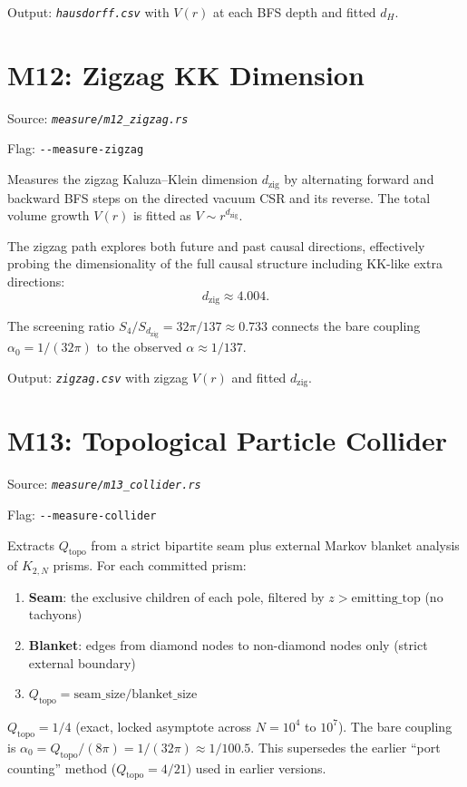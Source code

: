 \documentclass[11pt, a4paper, openany]{book}
\newcommand{\flag}[1]{\texttt{-{}-#1}}
\newcommand{\file}[1]{\texttt{\itshape #1}}
\begin{document}
Output: \file{hausdorff.csv} with $V(r)$ at each BFS depth and fitted $d_H$.

\section{M12: Zigzag KK Dimension}

Source: \file{measure/m12\_zigzag.rs}

Flag: \flag{measure-zigzag}

Measures the zigzag Kaluza--Klein dimension $d_{\text{zig}}$ by alternating
forward and backward BFS steps on the directed vacuum CSR and its reverse.
The total volume growth $V(r)$ is fitted as $V \sim r^{d_{\text{zig}}}$.

The zigzag path explores both future and past causal directions, effectively
probing the dimensionality of the full causal structure including KK-like
extra directions:
\[
  d_{\text{zig}} \approx 4.004.
\]

The screening ratio $S_4 / S_{d_{\text{zig}}} = 32\pi / 137 \approx 0.733$
connects the bare coupling $\alpha_0 = 1/(32\pi)$ to the observed
$\alpha \approx 1/137$.

Output: \file{zigzag.csv} with zigzag $V(r)$ and fitted $d_{\text{zig}}$.

\section{M13: Topological Particle Collider}

Source: \file{measure/m13\_collider.rs}

Flag: \flag{measure-collider}

Extracts $Q_{\text{topo}}$ from a strict bipartite seam plus external Markov
blanket analysis of $K_{2,N}$ prisms.  For each committed prism:

\begin{enumerate}
  \item \textbf{Seam}: the exclusive children of each pole, filtered by
        $z > \text{emitting\_top}$ (no tachyons)
  \item \textbf{Blanket}: edges from diamond nodes to non-diamond nodes only
        (strict external boundary)
  \item $Q_{\text{topo}} = \text{seam\_size} / \text{blanket\_size}$
\end{enumerate}

\begin{result}
  $Q_{\text{topo}} = 1/4$ (exact, locked asymptote across $N = 10^4$ to $10^7$).
  The bare coupling is $\alpha_0 = Q_{\text{topo}} / (8\pi) = 1/(32\pi)
  \approx 1/100.5$.  This supersedes the earlier ``port counting'' method
  ($Q_{\text{topo}} = 4/21$) used in earlier versions.
\end{result}
\end{document}
